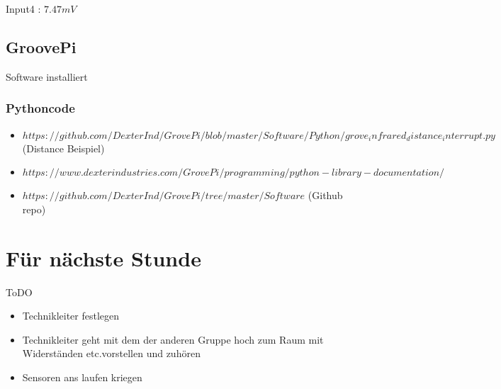 \documentclass{article}
\begin{document}
Input4 : $7.47mV$

\subsection{GroovePi}

Software installiert

\subsubsection{Pythoncode}

\begin{itemize}

\item $https://github.com/DexterInd/GrovePi/blob/master/Software/Python/grove_infrared_distance_interrupt.py$ (Distance Beispiel)

\item $https://www.dexterindustries.com/GrovePi/programming/python-library-documentation/$

\item $https://github.com/DexterInd/GrovePi/tree/master/Software$ (Github repo)

\end{itemize}

\section{F\"{u}r n\"{a}chste Stunde}

ToDO

\begin{itemize}

\item Technikleiter festlegen

\item Technikleiter geht mit dem der anderen Gruppe hoch zum Raum mit Widerst\"{a}nden etc.vorstellen und zuh\"{o}ren

\item Sensoren ans laufen kriegen

\end{itemize}
\end{document}
